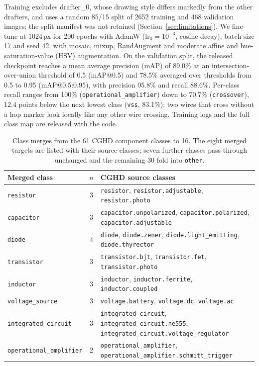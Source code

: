 \documentclass[journal]{IEEEtran}
\begin{document}
Training excludes drafter\_0, whose drawing style differs markedly from the other drafters, and uses a random 85/15 split of 2652 training and 468 validation images; the split manifest was not retained (Section~\ref{sec:limitations}). We fine-tune at 1024\,px for 200 epochs with AdamW ($\text{lr}_0=10^{-3}$, cosine decay), batch size 17 and seed 42, with mosaic, mixup, RandAugment and moderate affine and hue-saturation-value (HSV) augmentation. On the validation split, the released checkpoint reaches a mean average precision (mAP) of 89.0\% at an intersection-over-union threshold of 0.5 (mAP@0.5) and 78.5\% averaged over thresholds from 0.5 to 0.95 (mAP@0.5:0.95), with precision 95.8\% and recall 88.6\%. Per-class recall ranges from 100\% (\texttt{operational\_amplifier}) down to 70.7\% (\texttt{crossover}), 12.4 points below the next lowest class (\texttt{vss}, 83.1\%): two wires that cross without a hop marker look locally like any other wire crossing. Training logs and the full class map are released with the code.

\begin{table}[t]
\caption{Class merges from the 61 CGHD component classes to 16. The eight merged targets are listed with their source classes; seven further classes pass through unchanged and the remaining 30 fold into \texttt{other}.}
\label{tab:class_merge}
\centering
\footnotesize
\setlength{\tabcolsep}{4pt}
\begin{tabular}{@{}lcl@{}}
\toprule
\textbf{Merged class} & $n$ & \textbf{CGHD source classes} \\
\midrule
\texttt{resistor} & 3 & \texttt{resistor}, \texttt{resistor.adjustable}, \texttt{resistor.photo} \\
\texttt{capacitor} & 3 & \texttt{capacitor.unpolarized}, \texttt{capacitor.polarized}, \texttt{capacitor.adjustable} \\
\texttt{diode} & 4 & \texttt{diode}, \texttt{diode.zener}, \texttt{diode.light\_emitting}, \texttt{diode.thyrector} \\
\texttt{transistor} & 3 & \texttt{transistor.bjt}, \texttt{transistor.fet}, \texttt{transistor.photo} \\
\texttt{inductor} & 3 & \texttt{inductor}, \texttt{inductor.ferrite}, \texttt{inductor.coupled} \\
\texttt{voltage\_source} & 3 & \texttt{voltage.battery}, \texttt{voltage.dc}, \texttt{voltage.ac} \\
\texttt{integrated\_circuit} & 3 & \texttt{integrated\_circuit}, \texttt{integrated\_circuit.ne555}, \texttt{integrated\_circuit.voltage\_regulator} \\
\texttt{operational\_amplifier} & 2 & \texttt{operational\_amplifier}, \texttt{operational\_amplifier.schmitt\_trigger} \\
\bottomrule
\end{tabular}
\end{table}
\end{document}

